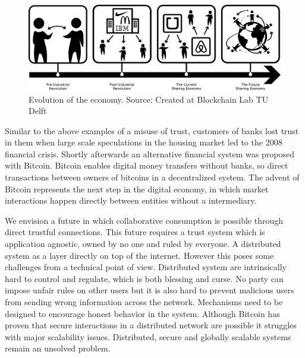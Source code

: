 \begin{figure}[t]
    \centering
    \includegraphics[width=\textwidth]{images/economy.png}
    \caption{Evolution of the economy. Source: Created at Blockchain Lab TU Delft}
    \label{fig:economy}
\end{figure}

Similar to the above examples of a misuse of trust, customers of banks lost trust in them when large
scale speculations in the housing market led to the 2008 financial crisis\cite{financial_crisis}. 
Shortly afterwards an alternative financial system was proposed with Bitcoin\cite{nakamoto2008bitcoin}.
Bitcoin enables digital money transfers without banks, so direct transactions between owners of 
bitcoins in a decentralized system. The advent of Bitcoin represents the next step in the digital
economy, in which market interactions happen directly between entities without a intermediary.



We envision a future in which collaborative consumption is possible through direct trustful connections. This
future requires a trust system which is application agnostic, owned by no one and ruled by 
everyone. A distributed system as a layer directly on top of the internet. However this poses some 
challenges from a technical point of view. Distributed system are intrinsically hard to control and regulate, which is both 
blessing and curse. No party can impose unfair rules on other users but it is also hard to prevent 
malicious users from sending wrong information across the network. Mechanisms need to be designed to
encourage honest behavior in the system. Although Bitcoin has proven that secure interactions in a
distributed network are possible it struggles with major scalability issues. Distributed, secure and
globally scalable systems remain an unsolved problem. 

